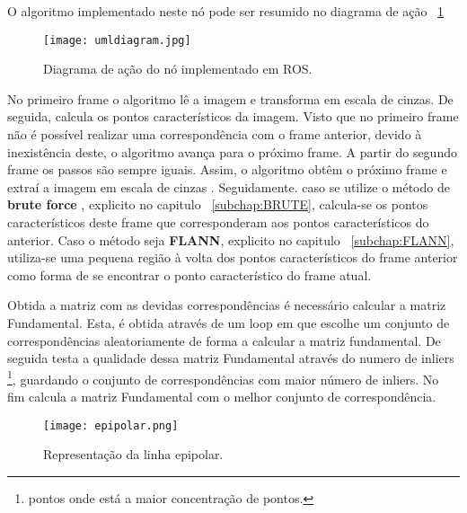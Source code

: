 O algoritmo implementado neste nó pode ser resumido no diagrama de ação ~\ref{fig:diaguml}

\begin{figure}[h!] %
	\begin{center}
		\leavevmode		
		\texttt{[image: umldiagram.jpg]}
		\caption{Diagrama de ação do nó implementado em ROS.}
		\label{fig:diaguml}
	\end{center}
\end{figure}



No primeiro frame o algoritmo lê a imagem e transforma em escala de cinzas. De seguida, calcula os pontos característicos da imagem. Visto que no primeiro frame não é possível realizar uma correspondência com o frame anterior, devido à inexistência deste, o algoritmo avança para o próximo frame. A partir do segundo frame os passos são sempre iguais. Assim, o algoritmo obtêm o próximo frame e extraí a imagem em escala de cinzas . Seguidamente. caso se utilize o método de \textbf{brute force} , explicito no capitulo ~\ref{subchap:BRUTE}, calcula-se os pontos característicos deste frame que corresponderam aos pontos característicos do anterior. Caso o método seja \textbf{FLANN}, explicito no capitulo ~\ref{subchap:FLANN}, utiliza-se uma pequena região à volta dos pontos característicos do frame anterior como forma de se encontrar o ponto característico do frame atual. 


Obtida a matriz com as devidas correspondências é necessário calcular a matriz Fundamental. Esta, é obtida através de um loop em que escolhe um conjunto de correspondências aleatoriamente de forma a calcular a matriz fundamental. De seguida testa a qualidade dessa matriz Fundamental através do numero de inliers \footnote{pontos onde está a maior concentração de pontos.}, guardando o conjunto de correspondências com maior número de inliers. No fim calcula a matriz Fundamental com o melhor conjunto de correspondência.


\begin{figure}[h!] %
	\begin{center}
		\leavevmode		
		\texttt{[image: epipolar.png]}
		\caption{Representação da linha epipolar.}
		\label{fig:equ}
	\end{center}
\end{figure}


